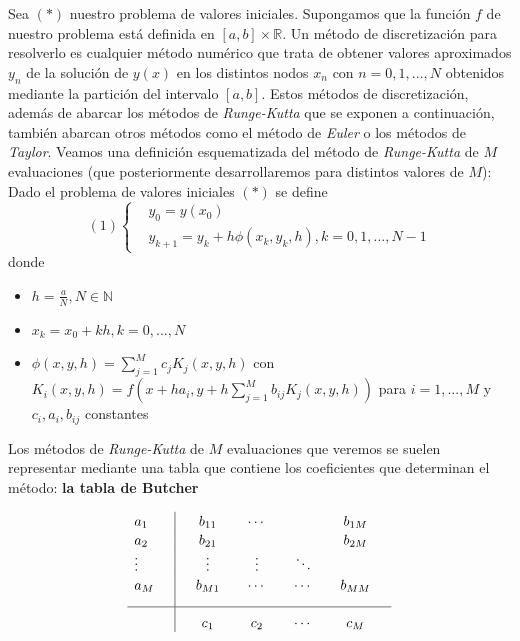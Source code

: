 \documentclass[paper=a4, fontsize=11pt]{scrartcl} %
\numberwithin{equation}{section}
\begin{document}
	 Sea $(*)$ nuestro problema de valores iniciales. Supongamos que la función $f$ de nuestro problema está definida en $[a,b]\times\mathbb{R}$. Un método de discretización para resolverlo es cualquier método numérico que trata de obtener valores aproximados $y_n$ de la solución de $y(x)$ en los distintos nodos $x_n$ con $n={0,1,...,N}$ obtenidos mediante la partición del intervalo $[a,b]$.
	 \newline\newline
	 Estos métodos de discretización, además de abarcar los métodos de \textit{Runge-Kutta} que se exponen a continuación, también abarcan otros métodos como el método de \textit{Euler} o los métodos de \textit{Taylor}.
	 \newline
	 Veamos una definición esquematizada del método de \textit{Runge-Kutta} de $M$ evaluaciones (que posteriormente desarrollaremos para distintos valores de $M$):
	 \newline
	 Dado el problema de valores iniciales $(*)$ se define
	 \begin{equation*}
	 (1)\begin{cases} 
	 &\text{$y_0 = y(x_0)$}
	 \\
	 &\text{$y_{k+1} = y_k + h\phi(x_k,y_k,h) , k= 0,1,...,N-1$} 
	 \end{cases} 
	 \end{equation*}
	 donde
	 \begin{itemize}
	 	\item $h=\frac{a}{N} , N\in\mathbb{N}$
	 	\item $x_k = x_0 + kh , k=0,...,N$
	 	\item $\phi(x,y,h) = \sum_{j=1}^{M}c_jK_j(x,y,h)$ con $K_i(x,y,h)=f(x+ha_i,y+h\sum_{j=1}^{M}b_{ij}K_j(x,y,h))$ para $i=1,...,M$ y $c_i, a_i, b_{ij}$ constantes
	 \end{itemize}
	 Los métodos de \textit{Runge-Kutta} de $M$ evaluaciones que veremos se suelen representar mediante una tabla que contiene los coeficientes que determinan el método: \newline\textbf{la tabla de Butcher}
	 
	 \begin{table}[h]
	 	\begin{equation*}
	 	\begin{array}{l | c c c c c}
	 	\rule{0pt}{2,3ex} a_1    \quad & \quad b_{11}  & \quad \cdots   &              & \quad b_{1M} &   \\
	 	\rule{0pt}{2,3ex} a_2    \quad & \quad b_{21}  &              &              & \quad b_{2M}        &   \\
	 	\rule{0pt}{2,3ex} \vdots \quad & \quad \vdots & \quad \vdots & \quad \ddots &         &   \\
	 	\rule{0pt}{2,3ex} a_M    \quad & \quad b_{M1}  & \quad \cdots  & \quad \cdots & \quad b_{MM} & \\[2,0ex] \hline
	 	\rule{0pt}{3,3ex}              & \quad c_{1}  & \quad c_{2}    & \quad \cdots & \quad c_{M}  & 
	 	\end{array}
	 	\end{equation*}
	 \end{table}
	 
\end{document}
